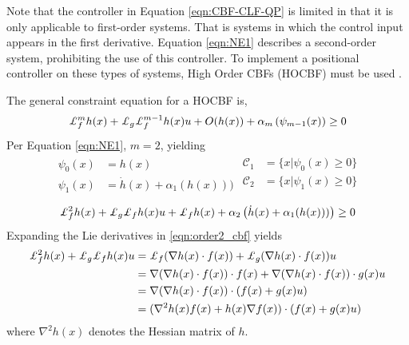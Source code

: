 Note that the controller in Equation \ref{eqn:CBF-CLF-QP} is limited in that it is only applicable to first-order systems. That is systems in which the control input appears in the first derivative. Equation \ref{eqn:NE1} describes a second-order system, prohibiting the use of this controller. To implement a positional controller on these types of systems, High Order CBFs (HOCBF) must be used \Cite{Xiao, Nguyen}. \newline

The general constraint equation for a HOCBF is, 
\begin{align}
    \Lie_f^m h(x) + \Lie_g\Lie_f^{m-1}h(x)u + O(h(x)) + \alpha_m\left (\psi_{m-1}(x) \right ) \geq 0
\end{align}
\noindent Per Equation \ref{eqn:NE1}, $m = 2$, yielding
\begin{align}
   \begin{split}
        \psi_0(x) &= h(x) \\
        \psi_1(x) &= \dot{h}(x) + \alpha_1(h(x)))
   \end{split}
   \begin{split}
        \mathcal{C}_1 &= \{ x | \psi_0(x) \geq 0\} \\
        \mathcal{C}_2 &= \{ x | \psi_1(x) \geq 0\} \\
   \end{split}
\end{align}
\begin{align} \label{eqn:order2_cbf}
     \Lie_f^2 h(x) + \Lie_g\Lie_f h(x)u + \Lie_f h(x) + \alpha_2\left (\dot{h}(x) + \alpha_1(h(x))) \right ) \geq 0
\end{align}
Expanding the Lie derivatives in \ref{eqn:order2_cbf} yields
\begin{align}
    \Lie_f^2 h(x) + \Lie_g\Lie_f h(x)u &= \Lie_f (\nabla h(x) \cdot f(x)) + \Lie_g(\nabla h(x) \cdot f(x))u \nonumber\\
    &= \nabla (\nabla h(x) \cdot f(x)) \cdot f(x) + \nabla (\nabla h(x) \cdot f(x)) \cdot g(x) u \nonumber\\
    &= \nabla (\nabla h(x) \cdot f(x)) \cdot (f(x) + g(x)u) \nonumber\\
    &= (\nabla^2h(x)f(x) + h(x) \nabla f(x)) \cdot (f(x) + g(x)u) \label{eqn:lie_expanded}
\end{align}
\noindent where $\nabla^2h(x)$ denotes the Hessian matrix of $h$. \newline

